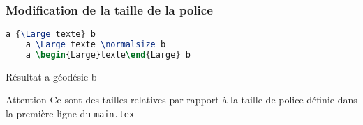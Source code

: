 \begin{frame}[containsverbatim]
    \frametitle{Modification de la taille de la police}
    \begin{lstlisting}[language=TeX, caption=Différentes manières]
    a {\Large texte} b
    a \Large texte \normalsize b
    a \begin{Large}texte\end{Large} b
    \end{lstlisting}
    \begin{exampleblock}{Résultat}
        a {\Large géodésie} b
    \end{exampleblock}
    \begin{alertblock}{Attention}
        Ce sont des tailles relatives par rapport à la taille de police définie dans la première ligne du \texttt{main.tex}
    \end{alertblock}
\end{frame}